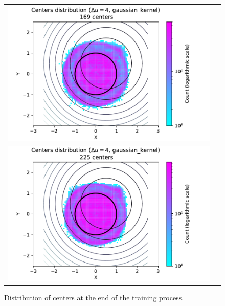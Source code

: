 \documentclass[12pt]{report} %
\begin{document}
\begin{figure}[h]
\begin{tabular}{cc}
    \includegraphics[width=.6\textwidth]{imagenes/experiments/2d/pde_parabola/circle_c169_pde_gaussian_kernel.pdf}   \\
    \includegraphics[width=.6\textwidth]{imagenes/experiments/2d/pde_parabola/circle_c225_pde_gaussian_kernel.pdf}
  \end{tabular}
  \caption{Distribution of centers at the end of the training process.}
  \label{fig:2d-pde-results-centers}
\end{figure}







\clearpage


\printbibliography




\end{document}
